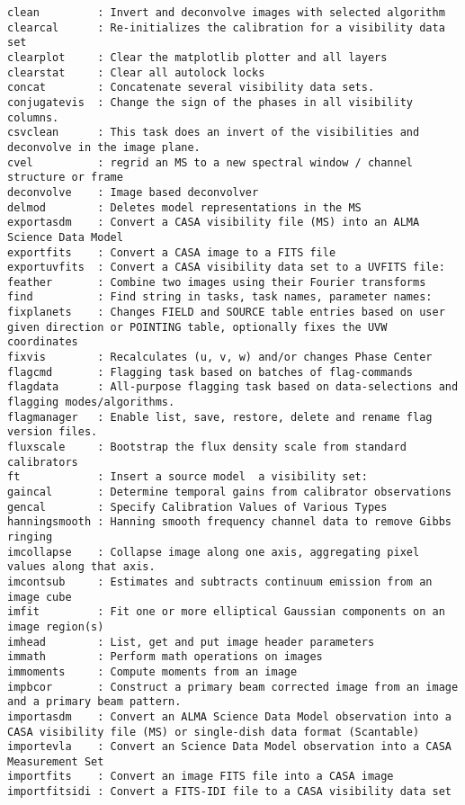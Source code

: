 \begin{verbatim}
clean         : Invert and deconvolve images with selected algorithm
clearcal      : Re-initializes the calibration for a visibility data set
clearplot     : Clear the matplotlib plotter and all layers
clearstat     : Clear all autolock locks
concat        : Concatenate several visibility data sets.
conjugatevis  : Change the sign of the phases in all visibility columns.
csvclean      : This task does an invert of the visibilities and deconvolve in the image plane.
cvel          : regrid an MS to a new spectral window / channel structure or frame
deconvolve    : Image based deconvolver
delmod        : Deletes model representations in the MS
exportasdm    : Convert a CASA visibility file (MS) into an ALMA Science Data Model
exportfits    : Convert a CASA image to a FITS file
exportuvfits  : Convert a CASA visibility data set to a UVFITS file:
feather       : Combine two images using their Fourier transforms
find          : Find string in tasks, task names, parameter names:
fixplanets    : Changes FIELD and SOURCE table entries based on user given direction or POINTING table, optionally fixes the UVW coordinates
fixvis        : Recalculates (u, v, w) and/or changes Phase Center 
flagcmd       : Flagging task based on batches of flag-commands
flagdata      : All-purpose flagging task based on data-selections and flagging modes/algorithms.
flagmanager   : Enable list, save, restore, delete and rename flag version files.
fluxscale     : Bootstrap the flux density scale from standard calibrators
ft            : Insert a source model  a visibility set:
gaincal       : Determine temporal gains from calibrator observations
gencal        : Specify Calibration Values of Various Types
hanningsmooth : Hanning smooth frequency channel data to remove Gibbs ringing
imcollapse    : Collapse image along one axis, aggregating pixel values along that axis.
imcontsub     : Estimates and subtracts continuum emission from an image cube
imfit         : Fit one or more elliptical Gaussian components on an image region(s)
imhead        : List, get and put image header parameters
immath        : Perform math operations on images
immoments     : Compute moments from an image
impbcor       : Construct a primary beam corrected image from an image and a primary beam pattern.
importasdm    : Convert an ALMA Science Data Model observation into a CASA visibility file (MS) or single-dish data format (Scantable)
importevla    : Convert an Science Data Model observation into a CASA Measurement Set
importfits    : Convert an image FITS file into a CASA image
importfitsidi : Convert a FITS-IDI file to a CASA visibility data set

\end{verbatim}
